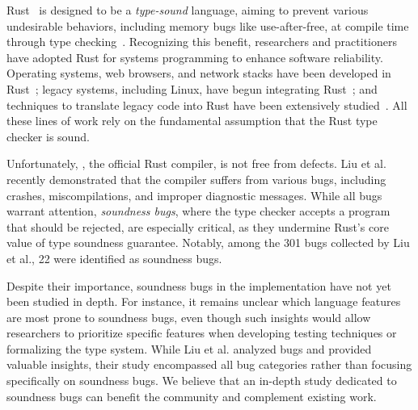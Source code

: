 Rust~\cite{matsakis2014rust} is designed to be a \emph{type-sound} language,
aiming to prevent various undesirable behaviors, including memory bugs like
use-after-free, at compile time through type checking~\cite{jung2017rustbelt}.
%
Recognizing this benefit, researchers and practitioners have adopted Rust for
systems programming to enhance software reliability.
%
Operating systems, web browsers, and network stacks have been developed in
Rust~\cite{levy2017multiprogramming, lankes2020rustyhermit,
narayanan2020redleaf, boos2020theseus, hu2024unishyper, peng2024framekernel,
dai2024verifying, hong2024taming, chiang2024securing, anderson2016engineering,
chen2025atmosphere, shang2025lwrustip};
%
legacy systems, including Linux, have begun integrating Rust~\cite{li2024rust,
netstack3, rust-dropbox, rust-coreutils};
%
and techniques to translate legacy code into Rust have been extensively
studied~\cite{emre2021translating, emre2023aliasing, zhang2023ownership,
hong2023concrat, hong2024dont, hong2024tag, wu2025genc2rust, hong2025forcrat,
hong2025automatically, hong2024type, zhou2025c2rusttv, xu2025optimizing,
zhang2025systematic, cai2026rustmap, zhang2025scalable}.
%
All these lines of work rely on the fundamental assumption that the Rust type
checker is sound.

Unfortunately, \rustc{}, the official Rust compiler, is not free from defects.
%
Liu et al.~\cite{liu2025empiricala} recently demonstrated that the compiler
suffers from various bugs, including crashes, miscompilations, and improper
diagnostic messages.
%
While all bugs warrant attention, \emph{soundness bugs}, where the type checker
accepts a program that should be rejected, are especially critical, as they
undermine Rust's core value of type soundness guarantee.
%
Notably, among the 301 \rustc{} bugs collected by Liu et al., 22 were identified
as soundness bugs.

Despite their importance, soundness bugs in the \rustc{} implementation have not
yet been studied in depth.
%
For instance, it remains unclear which language features are most prone to
soundness bugs, even though such insights would allow researchers to prioritize
specific features when developing testing techniques or formalizing the type
system.
%
While Liu et al. analyzed \rustc{} bugs and provided valuable insights, their
study encompassed all bug categories rather than focusing specifically on
soundness bugs.
%
We believe that an in-depth study dedicated to soundness bugs can benefit the
community and complement existing work.


